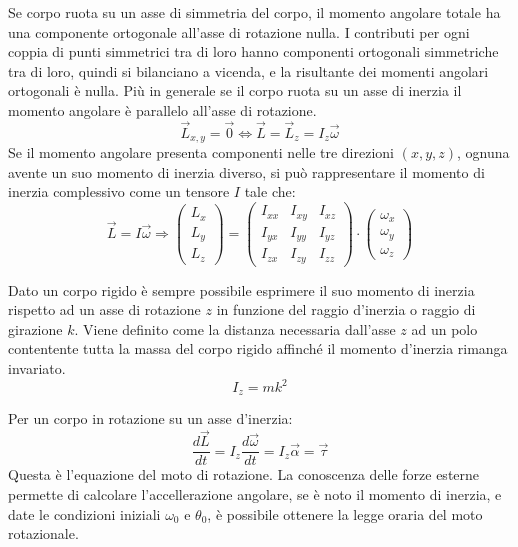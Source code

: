 \documentclass{article}
\numberwithin{equation}{subsection}
\begin{document}
Se corpo ruota su un asse di simmetria del corpo, il momento angolare totale ha una componente ortogonale all'asse di rotazione nulla. I contributi per ogni coppia di 
punti simmetrici tra di loro hanno componenti ortogonali simmetriche tra di loro, quindi si bilanciano a vicenda, e la risultante dei momenti angolari ortogonali è nulla. 
Più in generale se il corpo ruota su un asse di inerzia il momento angolare è parallelo all'asse di rotazione. 
\begin{equation}
    \vec{L}_{x,y}=\vec{0}\iff\vec{L}=\vec{L}_z=I_z\vec{\omega}
\end{equation}
Se il momento angolare presenta componenti 
nelle tre direzioni $(x,y,z)$, ognuna avente un suo momento 
di inerzia diverso, si può rappresentare il momento di inerzia 
complessivo come un tensore $I$ tale che:
\begin{equation*}
    \vec{L}=I\vec{\omega}\Rightarrow
    \begin{pmatrix}
        L_x\\
        L_y\\
        L_z
    \end{pmatrix}=
    \begin{pmatrix}
        I_{xx} & I_{xy} & I_{xz}\\
        I_{yx} & I_{yy} & I_{yz}\\
        I_{zx} & I_{zy} & I_{zz}
    \end{pmatrix}\cdot
    \begin{pmatrix}
        \omega_x\\
        \omega_y\\
        \omega_z
    \end{pmatrix}
\end{equation*}

Dato un corpo rigido è sempre possibile esprimere il suo momento di inerzia rispetto ad un asse di rotazione $z$ in funzione del raggio d'inerzia o raggio di girazione $k$. 
Viene definito come la distanza necessaria dall'asse $z$ ad un polo contentente tutta la massa del corpo rigido affinché il momento d'inerzia rimanga invariato. 
\begin{equation*}
    I_z=mk^2
\end{equation*}




Per un corpo in rotazione su un asse d'inerzia: 
\begin{equation}
    \displaystyle\frac{d\vec{L}}{dt}=I_z\frac{d\vec{\omega}}{dt}=I_z\vec{\alpha}=\vec{\tau}
\end{equation}
Questa è l'equazione del moto di rotazione. La conoscenza delle forze esterne permette di calcolare l'accellerazione angolare, se è noto il momento di inerzia, e date 
le condizioni iniziali $\omega_0$ e $\theta_0$, è possibile ottenere la legge oraria del moto rotazionale. 
\end{document}
